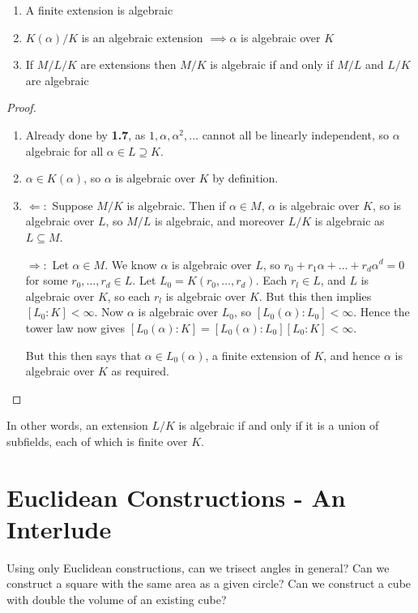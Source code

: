 \documentclass[a4paper, 10pt, twocolumn]{amsart}
\begin{document}
\begin{proposition}
\item
\begin{enumerate}
\item A finite extension is algebraic
\item $K(\alpha) / K$ is an algebraic extension $\implies \alpha$ is algebraic over $K$
\item If $M/L/K$ are extensions then $M/K$ is algebraic if and only if $M/L$ and $L/K$ are algebraic
\end{enumerate}
\end{proposition}
\begin{proof}
\item
\begin{enumerate}
\item Already done by \textbf{1.7}, as $1, \alpha, \alpha^2, \ldots$ cannot all be linearly independent, so $\alpha$ algebraic for all $\alpha \in L \supseteq K$.
\item $\alpha \in K(\alpha)$, so $\alpha$ is algebraic over $K$ by definition.
\item $\Longleftarrow:$ Suppose $M/K$ is algebraic. Then if $\alpha\in M$, $\alpha$ is algebraic over $K$, so is algebraic over $L$, so $M/L$ is algebraic, and moreover $L/K$ is algebraic as $L\subseteq M$.

$\Longrightarrow:$ Let $\alpha\in M$. We know $\alpha$ is algebraic over $L$, so $r_0 + r_1\alpha+\ldots +r_d \alpha^d = 0$ for some $r_0, \ldots, r_d \in L$. Let $L_0 = K(r_0, \ldots, r_d)$. Each $r_l\in L$, and $L$ is algebraic over $K$, so each $r_l$ is algebraic over $K$. But this then implies $[L_0:K] <\infty$. Now $\alpha$ is algebraic over $L_0$, so $[L_0(\alpha):L_0] < \infty$. Hence the tower law now gives $[L_0(\alpha):K] = [L_0(\alpha):L_0][L_0:K] < \infty$.

But this then says that $\alpha \in L_0(\alpha)$, a finite extension of $K$, and hence $\alpha$ is algebraic over $K$ as required.
\end{enumerate}
\end{proof}
In other words, an extension $L/K$ is algebraic if and only if it is a union of subfields, each of which is finite over $K$.

\section{Euclidean Constructions - An Interlude}
Using only Euclidean constructions, can we trisect angles in general? Can we construct a square with the same area as a given circle? Can we construct a cube with double the volume of an existing cube?
\end{document}
